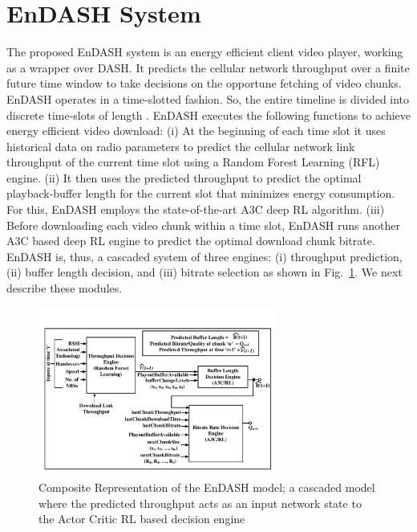 \section{\textbf{EnDASH System}}\label{sec:chap04:sys_overview}
The proposed EnDASH system is an energy efficient client video player, working as a wrapper over \ac{DASH}. It predicts the cellular network throughput over a finite future time window to take decisions on the opportune fetching of  video chunks.  EnDASH operates in a time-slotted fashion. So, the entire timeline is divided into discrete time-slots of length .
EnDASH executes the following functions to achieve energy efficient video download: (i) At the beginning of each time slot it uses historical data on radio parameters to predict the cellular network link throughput of the current time slot using a Random Forest Learning (RFL) engine. (ii) It then uses the predicted throughput to predict the optimal playback-buffer length for the current slot that minimizes energy consumption. For this, EnDASH employs the state-of-the-art \ac{A3C} deep \ac{RL} algorithm.  (iii) Before downloading each video chunk within a time slot, EnDASH runs another A3C based deep \ac{RL} engine to predict the optimal download chunk  bitrate. 
EnDASH is, thus, a cascaded system of three engines: (i) throughput prediction, (ii) buffer length decision,  and (iii) bitrate selection as shown in Fig.~\ref{fig:chap04:EnDASH system}. We next describe these modules.
 \begin{figure}[t]
	\centering
	\includegraphics[width = 0.7\textwidth,trim = {1cm 1cm 1cm 1cm}]{figures/EnDASH_system.pdf}
	\caption{Composite Representation of the EnDASH model; a cascaded model where the predicted throughput acts as an input network state to the Actor Critic \ac{RL} based decision engine}
	\label{fig:chap04:EnDASH system}
\end{figure}

